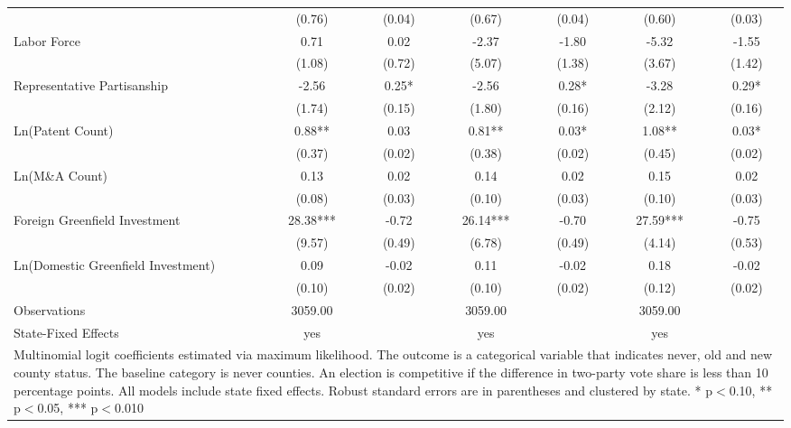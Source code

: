 \begin{table}[!htbp]
\begin{tabular}{l*{6}{c}}
                    &      (0.76)   &      (0.04)   &      (0.67)   &      (0.04)   &      (0.60)   &      (0.03)   \\
Labor Force         &        0.71   &        0.02   &       -2.37   &       -1.80   &       -5.32   &       -1.55   \\
                    &      (1.08)   &      (0.72)   &      (5.07)   &      (1.38)   &      (3.67)   &      (1.42)   \\
Representative Partisanship&       -2.56   &        0.25*  &       -2.56   &        0.28*  &       -3.28   &        0.29*  \\
                    &      (1.74)   &      (0.15)   &      (1.80)   &      (0.16)   &      (2.12)   &      (0.16)   \\
Ln(Patent Count)    &        0.88** &        0.03   &        0.81** &        0.03*  &        1.08** &        0.03*  \\
                    &      (0.37)   &      (0.02)   &      (0.38)   &      (0.02)   &      (0.45)   &      (0.02)   \\
Ln(M\&A Count)      &        0.13   &        0.02   &        0.14   &        0.02   &        0.15   &        0.02   \\
                    &      (0.08)   &      (0.03)   &      (0.10)   &      (0.03)   &      (0.10)   &      (0.03)   \\
Foreign Greenfield Investment&       28.38***&       -0.72   &       26.14***&       -0.70   &       27.59***&       -0.75   \\
                    &      (9.57)   &      (0.49)   &      (6.78)   &      (0.49)   &      (4.14)   &      (0.53)   \\
Ln(Domestic Greenfield Investment)&        0.09   &       -0.02   &        0.11   &       -0.02   &        0.18   &       -0.02   \\
                    &      (0.10)   &      (0.02)   &      (0.10)   &      (0.02)   &      (0.12)   &      (0.02)   \\
\hline
Observations        &     3059.00   &               &     3059.00   &               &     3059.00   &               \\
State-Fixed Effects &         yes   &               &         yes   &               &         yes   &               \\
\hline\hline
\multicolumn{7}{p{\linewidth}}{\footnotesize Multinomial logit coefficients estimated via maximum likelihood. The outcome is a categorical variable that indicates  never, old and new county status. The baseline category is never counties. An election is competitive if the difference in two-party vote share is less than 10 percentage points. All models include state fixed effects. Robust standard errors are in parentheses and clustered by state. * p$<$0.10, ** p$<$0.05, *** p$<$0.010}\\
\end{tabular}
\end{table}
